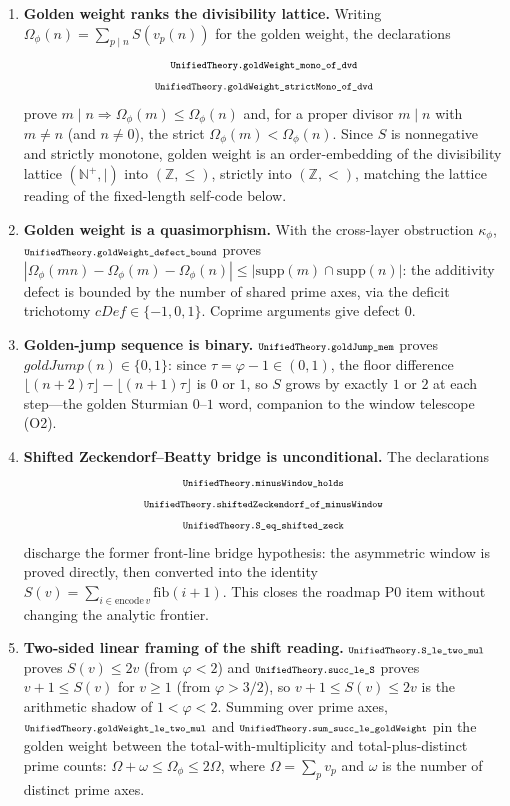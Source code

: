 \documentclass[11pt]{article}
\newcommand{\lean}[1]{\relax\ifmmode\hbox{\scriptsize\ttfamily\detokenize{#1}}\else{\small\texttt{\detokenize{#1}}}\fi}
\newcommand{\phiG}{\varphi}
\begin{document}
\begin{enumerate}[label=(G\arabic*)]
  \item \textbf{Golden weight ranks the divisibility lattice.}  Writing $\Omega_\phi(n)=\sum_{p\mid n}S(v_p(n))$ for the golden weight, the declarations
  $$
    \begin{gathered}
    \lean{UnifiedTheory.goldWeight_mono_of_dvd}\\
    \lean{UnifiedTheory.goldWeight_strictMono_of_dvd}
    \end{gathered}
  $$
  prove $m\mid n\Rightarrow\Omega_\phi(m)\le\Omega_\phi(n)$ and, for a proper divisor $m\mid n$ with $m\ne n$ (and $n\ne0$), the strict $\Omega_\phi(m)<\Omega_\phi(n)$.  Since $S$ is nonnegative and strictly monotone, golden weight is an order-embedding of the divisibility lattice $(\mathbb{N}^+,\mid)$ into $(\mathbb{Z},\le)$, strictly into $(\mathbb{Z},<)$, matching the lattice reading of the fixed-length self-code below.
  \item \textbf{Golden weight is a quasimorphism.}  With the cross-layer obstruction $\kappa_\phi$, $\lean{UnifiedTheory.goldWeight_defect_bound}$ proves $|\Omega_\phi(mn)-\Omega_\phi(m)-\Omega_\phi(n)|\le|\mathrm{supp}(m)\cap\mathrm{supp}(n)|$: the additivity defect is bounded by the number of shared prime axes, via the deficit trichotomy $cDef\in\{-1,0,1\}$.  Coprime arguments give defect $0$.
  \item \textbf{Golden-jump sequence is binary.}  $\lean{UnifiedTheory.goldJump_mem}$ proves $goldJump(n)\in\{0,1\}$: since $\tau=\phiG-1\in(0,1)$, the floor difference $\lfloor(n+2)\tau\rfloor-\lfloor(n+1)\tau\rfloor$ is $0$ or $1$, so $S$ grows by exactly $1$ or $2$ at each step---the golden Sturmian $0$--$1$ word, companion to the window telescope (O2).
  \item \textbf{Shifted Zeckendorf--Beatty bridge is unconditional.}  The declarations
  $$
    \begin{gathered}
    \lean{UnifiedTheory.minusWindow_holds}\\
    \lean{UnifiedTheory.shiftedZeckendorf_of_minusWindow}\\
    \lean{UnifiedTheory.S_eq_shifted_zeck}
    \end{gathered}
  $$
  discharge the former front-line bridge hypothesis: the asymmetric window is proved directly, then converted into the identity $S(v)=\sum_{i\in\mathrm{encode}\,v}\mathrm{fib}(i+1)$.  This closes the roadmap P0 item without changing the analytic frontier.
  \item \textbf{Two-sided linear framing of the shift reading.}  $\lean{UnifiedTheory.S_le_two_mul}$ proves $S(v)\le 2v$ (from $\phiG<2$) and $\lean{UnifiedTheory.succ_le_S}$ proves $v+1\le S(v)$ for $v\ge1$ (from $\phiG>3/2$), so $v+1\le S(v)\le 2v$ is the arithmetic shadow of $1<\phiG<2$.  Summing over prime axes, $\lean{UnifiedTheory.goldWeight_le_two_mul}$ and $\lean{UnifiedTheory.sum_succ_le_goldWeight}$ pin the golden weight between the total-with-multiplicity and total-plus-distinct prime counts: $\Omega+\omega\le\Omega_\phi\le 2\Omega$, where $\Omega=\sum_p v_p$ and $\omega$ is the number of distinct prime axes.

\end{enumerate}
\end{document}
